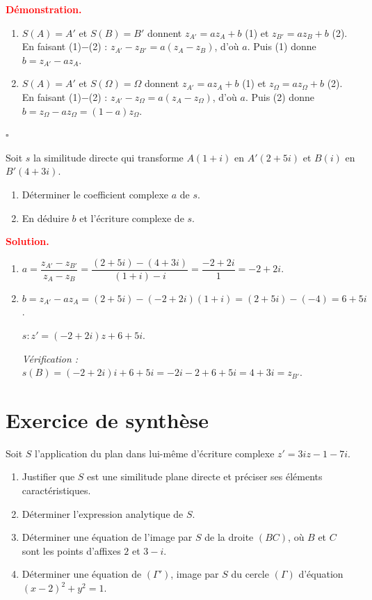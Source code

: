 \documentclass[12pt,a4paper]{article}
\newcommand{\zO}{z_{\Omega}}
\newenvironment{demo}
  {\par\smallskip\noindent\textbf{\textcolor{red}{Démonstration.}}\ }
  {\hfill$\square$\par\smallskip}
\newcommand{\solution}{\par\smallskip\noindent\textbf{\textcolor{red}{Solution.}}\par}
\begin{document}
\begin{demo}
\begin{enumerate}
  \item $S(A)=A'$ et $S(B)=B'$ donnent $z_{A'}=az_A+b$ (1) et $z_{B'}=az_B+b$ (2).
  En faisant (1)$-$(2) : $z_{A'}-z_{B'}=a(z_A-z_B)$, d'où $a$. Puis (1) donne $b=z_{A'}-az_A$.
  \item $S(A)=A'$ et $S(\Omega)=\Omega$ donnent $z_{A'}=az_A+b$ (1) et $\zO=a\zO+b$ (2).
  En faisant (1)$-$(2) : $z_{A'}-\zO=a(z_A-\zO)$, d'où $a$. Puis (2) donne $b=\zO-a\zO=(1-a)\zO$.
\end{enumerate}
\end{demo}

\begin{exo}
Soit $s$ la similitude directe qui transforme $A(1+i)$ en $A'(2+5i)$ et $B(i)$ en $B'(4+3i)$.
\begin{enumerate}
  \item Déterminer le coefficient complexe $a$ de $s$.
  \item En déduire $b$ et l'écriture complexe de $s$.
\end{enumerate}
\end{exo}

\solution
\begin{enumerate}
  \item $a=\dfrac{z_{A'}-z_{B'}}{z_A-z_B}=\dfrac{(2+5i)-(4+3i)}{(1+i)-i}=\dfrac{-2+2i}{1}=-2+2i$.
  \item $b=z_{A'}-az_A=(2+5i)-(-2+2i)(1+i)=(2+5i)-(-4)=6+5i$.
  \begin{resultat}
  $s : z'=(-2+2i)z+6+5i$.
  \end{resultat}
  \emph{Vérification :} $s(B)=(-2+2i)i+6+5i=-2i-2+6+5i=4+3i=z_{B'}$.
\end{enumerate}

\section{Exercice de synthèse}

\begin{exo}
Soit $S$ l'application du plan dans lui-même d'écriture complexe $z'=3iz-1-7i$.
\begin{enumerate}
  \item Justifier que $S$ est une similitude plane directe et préciser ses éléments caractéristiques.
  \item Déterminer l'expression analytique de $S$.
  \item Déterminer une équation de l'image par $S$ de la droite $(BC)$, où $B$ et $C$ sont les points d'affixes $2$ et $3-i$.
  \item Déterminer une équation de $(\Gamma')$, image par $S$ du cercle $(\Gamma)$ d'équation $(x-2)^2+y^2=1$.
\end{enumerate}
\end{exo}
\end{document}
